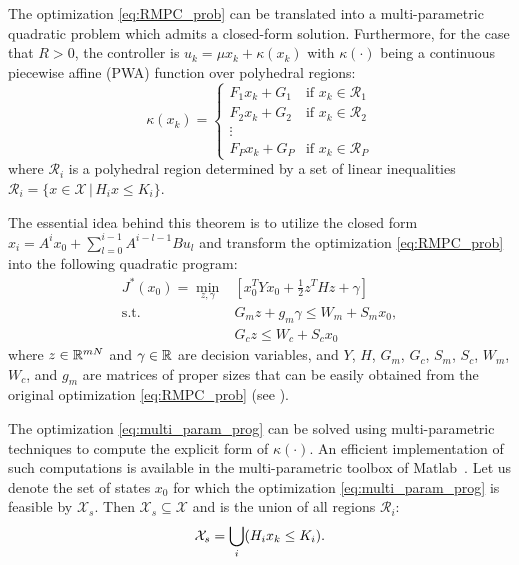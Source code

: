 \begin{theorem}
\label{thm:EMPC}
The optimization \eqref{eq:RMPC_prob} can be translated into a multi-parametric quadratic problem which admits a closed-form solution. Furthermore, for the case that $R>0$, the controller is $u_k = \mu x_k + \kappa(x_k)$ with $\kappa(\cdot)$ being a continuous piecewise affine (PWA) function over polyhedral regions:
\begin{equation}
\label{eq:affine_map}
\kappa(x_k)=
\begin{cases}
F_1x_k+G_1 & \text{if $x_k\in \mathcal{R}_1$}\\
F_2x_k+G_2 & \text{if $x_k\in \mathcal{R}_2$}\\
\vdots\\
F_Px_k+G_P & \text{if $x_k\in \mathcal{R}_P$}
\end{cases} 
\end{equation}
where $\mathcal{R}_i$ is a polyhedral region determined by a set of linear inequalities $\mathcal R_i = \{x\in\mathcal X\,|\,H_ix\leq K_i\}$. 
\end{theorem}
The essential idea behind this theorem is to utilize the closed form $x_i=A^ix_0+\sum_{l=0}^{i-1}A^{i-l-1}Bu_l$ and transform the optimization \eqref{eq:RMPC_prob} into the following quadratic program:
\begin{align}
\label{eq:multi_param_prog}
J^{\ast}(x_0)=\min_{z,\gamma}& \left[x_0^TYx_0+\frac{1}{2}z^THz+\gamma\right]\\
\text{s.t.} \quad &G_mz+g_m\gamma\leq W_m+S_mx_0,\nonumber\\
&G_cz\leq W_c+S_cx_0\nonumber
\end{align}
where $z\in \mathbb{R}^{mN}$ and $\gamma\in\mathbb{R}$ are decision variables, and $Y$, $H$, $G_m$, $G_c$, $S_m$, $S_c$, $W_m$, $W_c$, and $g_m$ 
are matrices of proper sizes that can be easily obtained from the original optimization \eqref{eq:RMPC_prob}  (see \cite{delaPea:2005}).


The optimization \eqref{eq:multi_param_prog} can be solved using multi-parametric techniques to compute the explicit form of $\kappa(\cdot)$.
An efficient implementation of such computations is available in the multi-parametric toolbox of Matlab~\cite{matlabMPT, matlabYALMIP}.
Let us denote the set of states $x_0$ for which the optimization  \eqref{eq:multi_param_prog} is feasible by $\mathcal X_s$. Then $\mathcal X_s\subseteq \mathcal X$ and is the union of all regions $\mathcal{R}_{i}$:
\begin{equation}
\mathcal X_s = \bigcup_{i}(H_{i}x_{k}\leq K_{i}).
\end{equation}


